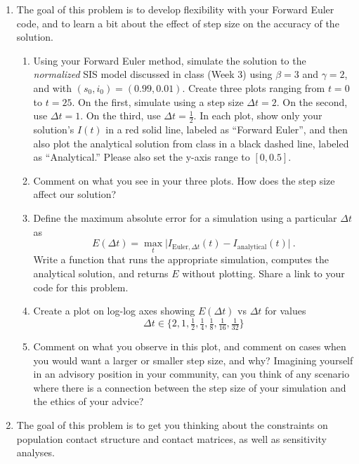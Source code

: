 \documentclass[11pt]{article}
\begin{document}
\begin{enumerate}
	\item The goal of this problem is to develop flexibility with your Forward Euler code, and to learn a bit about the effect of step size on the accuracy of the solution.
	
\begin{enumerate}[label=\alph*.]
	\item Using your Forward Euler method, simulate the solution to the {\it normalized} SIS model discussed in class (Week 3) using $\beta=3$ and $\gamma=2$, and with $(s_0, i_0) = (0.99, 0.01)$. Create three plots ranging from $t=0$ to $t=25$. On the first, simulate using a step size $\Delta t=2$. On the second, use $\Delta t =1$. On the third, use $\Delta t = \tfrac{1}{2}$. In each plot, show only your solution's $I(t)$ in a red solid line, labeled as ``Forward Euler'', and then also plot the analytical solution from class in a black dashed line, labeled as ``Analytical.'' Please also set the y-axis range to $[0,0.5]$. 
	\item Comment on what you see in your three plots. How does the step size affect our solution?
	\item Define the maximum absolute error for a simulation using a particular $\Delta t$ as $$E(\Delta t) = \max_{t} \big | I_{\text{Euler}, \Delta t} (t) - I_\text{analytical}(t) \big |\ .$$ Write a function that runs the appropriate simulation, computes the analytical solution, and returns $E$ without plotting. Share a link to your code for this problem.
	\item Create a plot on log-log axes showing $E(\Delta t)$ vs $\Delta t$ for values $$\Delta t \in \{2,1,\tfrac{1}{2},\tfrac{1}{4},\tfrac{1}{8},\tfrac{1}{16},\tfrac{1}{32}\}$$
	\item Comment on what you observe in this plot, and comment on cases when you would want a larger or smaller step size, and why? Imagining yourself in an advisory position in your community, can you think of any scenario where there is a connection between the step size of your simulation and the ethics of your advice?
\end{enumerate}

\clearpage
	\item The goal of this problem is to get you thinking about the constraints on population contact structure and contact matrices, as well as sensitivity analyses.
	

\end{enumerate}
\end{document}

